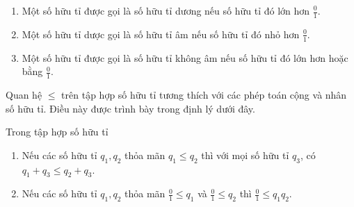 \begin{definition}
    \begin{enumerate}[label={(\roman*)}]
        \item Một số hữu tỉ được gọi là số hữu tỉ dương nếu số hữu tỉ đó lớn hơn $\frac{0}{1}$.
        \item Một số hữu tỉ dược gọi là số hữu tỉ âm nếu số hữu tỉ đó nhỏ hơn $\frac{0}{1}$.
        \item Một số hữu tỉ được gọi là số hữu tỉ không âm nếu số hữu tỉ đó lớn hơn hoặc bằng $\frac{0}{1}$.
    \end{enumerate}
\end{definition}

Quan hệ $\leq$ trên tập hợp số hữu tỉ tương thích với các phép toán cộng và nhân số hữu tỉ. Điều này được trình bày trong định lý dưới đây.
\begin{theorem}\label{theorem:rational-numbers-order-and-operations}
    Trong tập hợp số hữu tỉ
    \begin{enumerate}[label={(\roman*)}]
        \item Nếu các số hữu tỉ $q_{1}, q_{2}$ thỏa mãn $q_{1}\leq q_{2}$ thì với mọi số hữu tỉ $q_{3}$, có $q_{1} + q_{3}\leq q_{2} + q_{3}$.
        \item Nếu các số hữu tỉ $q_{1}, q_{2}$ thỏa mãn $\frac{0}{1}\leq q_{1}$ và $\frac{0}{1}\leq q_{2}$ thì $\frac{0}{1}\leq q_{1}q_{2}$.
    \end{enumerate}
\end{theorem}

